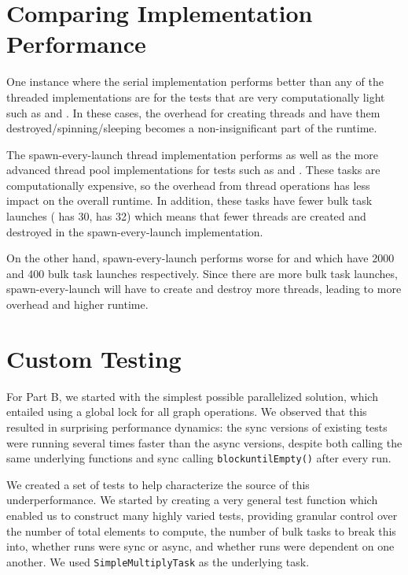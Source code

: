 \documentclass[11pt]{article}
\begin{document}
\section{Comparing Implementation Performance}

One instance where the serial implementation performs better than any of the
threaded implementations are for the tests that are very computationally light
such as  and . In these cases, the
overhead for creating threads and have them destroyed/spinning/sleeping becomes
a non-insignificant part of the runtime.

\medskip
The spawn-every-launch thread implementation performs as well as the more
advanced thread pool implementations for tests such as
 and
. These tasks are computationally expensive, so the
overhead from thread operations has less impact on the overall runtime. In
addition, these tasks have fewer bulk task launches (
has 30,  has 32)
which means that fewer threads are created and destroyed in the
spawn-every-launch implementation.

\smallskip
On the other hand, spawn-every-launch performs worse for
 and  which
have 2000 and 400 bulk task launches respectively. Since there are more bulk
task launches, spawn-every-launch will have to create and destroy more threads,
leading to more overhead and higher runtime.

\section{Custom Testing}

For Part B, we started with the simplest possible parallelized solution, which
entailed using a global lock for all graph operations. We observed that this
resulted in surprising performance dynamics: the sync versions of existing tests
were running several times faster than the async versions, despite both calling
the same underlying functions and sync calling \verb|blockuntilEmpty()| after
every run.

\bigskip
We created a set of tests to help characterize the source of this
underperformance. We started by creating a very general test function which
enabled us to construct many highly varied tests, providing granular control
over the number of total elements to compute, the number of bulk tasks to break
this into, whether runs were sync or async, and whether runs were dependent on
one another. We used \verb|SimpleMultiplyTask| as the underlying task.
\end{document}
